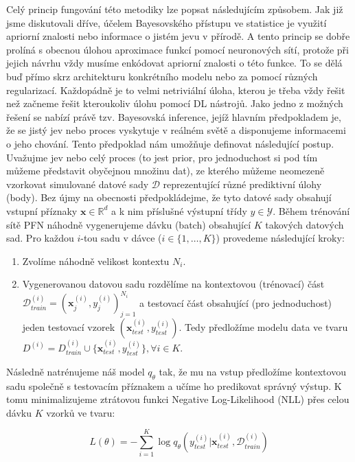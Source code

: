 Celý princip fungování této metodiky lze popsat následujícím způsobem.
Jak již jsme diskutovali dříve, účelem Bayesovského přístupu ve statistice je využití apriorní znalosti nebo informace o jistém jevu v přírodě. 
A tento princip se dobře prolíná s obecnou úlohou aproximace funkcí pomocí neuronových sítí, protože při jejich návrhu vždy musíme enkódovat apriorní znalosti o této funkce.
To se dělá buď přímo skrz architekturu konkrétního modelu nebo za pomocí různých regularizací. 
Každopádně je to velmi netriviální úloha, kterou je třeba vždy řešit než začneme řešit kteroukoliv úlohu pomocí DL nástrojů. 
Jako jedno z možných řešení se nabízí právě tzv. Bayesovská inference, jejíž hlavním předpokladem je, že se jistý jev nebo proces vyskytuje v reálném světě a disponujeme informacemi o jeho chování.
Tento předpoklad nám umožňuje definovat následující postup.    
Uvažujme jev nebo celý proces (to jest prior, pro jednoduchost si pod tím můžeme představit obyčejnou množinu dat), ze kterého můžeme neomezeně vzorkovat simulované datové sady $\mathcal{D}$ reprezentující různé prediktivní úlohy (body). 
Bez újmy na obecnosti předpokládejme, že tyto datové sady obsahují vstupní příznaky $\mathbf{x} \in \mathbb{R}^d$ a k nim příslušné výstupní třídy $y \in \mathcal{Y}$.
Během trénování sítě PFN náhodně vygenerujeme dávku (batch) obsahující $K$ takových datových sad. Pro každou $i$-tou sadu v dávce ($i \in \{1, \dots, K\}$) provedeme následující kroky:
\begin{enumerate}
    \item Zvolíme náhodně velikost kontextu $N_i$.
    \item Vygenerovanou datovou sadu rozdělíme na kontextovou (trénovací) část $\mathcal{D}^{(i)}_{train} = (\mathbf{x}_j^{(i)}, y_j^{(i)})_{j=1}^{N_i}$ a testovací část obsahující (pro jednoduchost) jeden testovací vzorek $(\mathbf{x}^{(i)}_{test}, y^{(i)}_{test})$. 
    Tedy předložíme modelu data ve tvaru $D^{(i)} = D^{(i)}_{train} \cup \{\mathbf{x}^{(i)}_{test}, y^{(i)}_{test}\}, \forall i \in K$.
\end{enumerate}

Následně natrénujeme náš model $q_\theta$ tak, že mu na vstup předložíme kontextovou sadu společně s testovacím příznakem a učíme ho predikovat správný výstup. K tomu minimalizujeme ztrátovou funkci Negative Log-Likelihood (NLL) přes celou dávku $K$ vzorků ve tvaru:

$$L(\theta) = - \sum_{i=1}^{K} \log q_{\theta}(y^{(i)}_{test} | \mathbf{x}^{(i)}_{test}, \mathcal{D}^{(i)}_{train})$$

